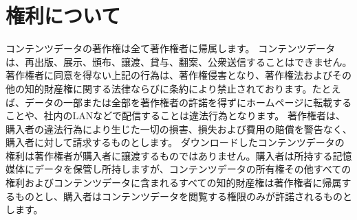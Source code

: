 
\section*{権利について}

コンテンツデータの著作権は全て著作権者に帰属します。
コンテンツデータは、再出版、展示、頒布、譲渡、貸与、翻案、公衆送信することはできません。著作権者に同意を得ない上記の行為は、著作権侵害となり、著作権法およびその他の知的財産権に関する法律ならびに条約により禁止されております。たとえば、データの一部または全部を著作権者の許諾を得ずにホームページに転載することや、社内のLANなどで配信することは違法行為となります。
著作権者は、購入者の違法行為により生じた一切の損害、損失および費用の賠償を警告なく、購入者に対して請求するものとします。
ダウンロードしたコンテンツデータの権利は著作権者が購入者に譲渡するものではありません。購入者は所持する記憶媒体にデータを保管し所持しますが、コンテンツデータの所有権その他すべての権利およびコンテンツデータに含まれるすべての知的財産権は著作権者に帰属するものとし、購入者はコンテンツデータを閲覧する権限のみが許諾されるものとします。
